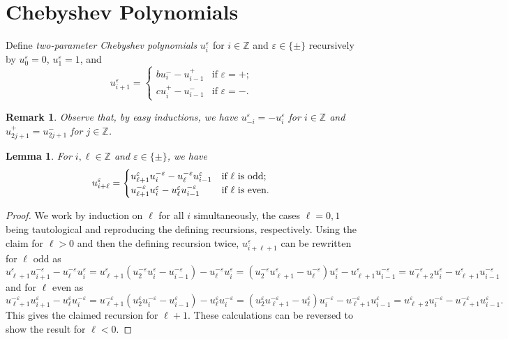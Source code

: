 \documentclass[pdflatex,sn-mathphys]{sn-jnl}%
\theoremstyle{thmstyleone}%
\newtheorem{lemma}[theorem]{Lemma}
\theoremstyle{thmstyletwo}%
\newtheorem{remark}[theorem]{Remark}%
\theoremstyle{thmstylethree}%
\newcommand{\ZZ}{\mathbb{Z}}
\begin{document}
\section{Chebyshev Polynomials}
  \label{sec:chebyshev}
  Define \emph{two-parameter Chebyshev polynomials} $u_i^\varepsilon$ for $i\in\ZZ$ and $\varepsilon\in\{\pm\}$ recursively by $u_0^\varepsilon=0$, $u_1^\varepsilon=1$, and
  \[u_{i+1}^\varepsilon=\begin{cases} bu_i^- -u_{i-1}^+ & \text{if $\varepsilon=+$;}\\ cu_i^+-u_{i-1}^- & \text{if $\varepsilon=-$.} \end{cases}\]
  \begin{remark}
    \label{rem:equivalences}
    Observe that, by easy inductions, we have $u_{-i}^\varepsilon=-u_i^\varepsilon$ for $i\in\ZZ$ and $u_{2j+1}^+=u_{2j+1}^-$ for $j\in\ZZ$.
  \end{remark}

  \begin{lemma}
    For $i,\ell\in\ZZ$ and $\varepsilon\in\{\pm\}$, we have
    \begin{equation}
      \label{eq:long Chebyshev recursion}
      u_{i+\ell}^\varepsilon=\begin{cases} u_{\ell+1}^\varepsilon u_i^{-\varepsilon}-u_\ell^{-\varepsilon} u_{i-1}^\varepsilon & \text{\upshape if $\ell$ is odd;}\\ u_{\ell+1}^{-\varepsilon} u_i^\varepsilon-u_\ell^\varepsilon u_{i-1}^{-\varepsilon} & \text{\upshape if $\ell$ is even.} \end{cases}
    \end{equation}
  \end{lemma}
  \begin{proof}
    We work by induction on $\ell$ for all $i$ simultaneously, the cases $\ell=0,1$ being tautological and reproducing the defining recursions, respectively.
    Using the claim for $\ell>0$ and then the defining recursion twice, $u_{i+\ell+1}^\varepsilon$ can be rewritten for $\ell$ odd as
    \[
      u_{\ell+1}^\varepsilon u_{i+1}^{-\varepsilon}-u_\ell^{-\varepsilon} u_i^\varepsilon
      =u_{\ell+1}^\varepsilon(u_2^{-\varepsilon}u_i^\varepsilon-u_{i-1}^{-\varepsilon}) -u_\ell^{-\varepsilon} u_i^\varepsilon 
      =(u_2^{-\varepsilon} u_{\ell+1}^\varepsilon-u_\ell^{-\varepsilon}) u_i^\varepsilon-u_{\ell+1}^\varepsilon u_{i-1}^{-\varepsilon}
      =u_{\ell+2}^{-\varepsilon} u_i^\varepsilon - u_{\ell+1}^\varepsilon u_{i-1}^{-\varepsilon}
    \]
    and for $\ell$ even as
    \[
      u_{\ell+1}^{-\varepsilon} u_{i+1}^\varepsilon-u_\ell^\varepsilon u_i^{-\varepsilon}
      =u_{\ell+1}^{-\varepsilon}(u_2^\varepsilon u_i^{-\varepsilon}-u_{i-1}^\varepsilon) -u_\ell^\varepsilon u_i^{-\varepsilon}
      =(u_2^\varepsilon u_{\ell+1}^{-\varepsilon}-u_\ell^\varepsilon) u_i^{-\varepsilon}-u_{\ell+1}^{-\varepsilon} u_{i-1}^\varepsilon
      =u_{\ell+2}^\varepsilon u_i^{-\varepsilon}-u_{\ell+1}^{-\varepsilon} u_{i-1}^\varepsilon.
    \]
    This gives the claimed recursion for $\ell+1$.
    These calculations can be reversed to show the result for $\ell<0$.
  \end{proof}
\end{document}
